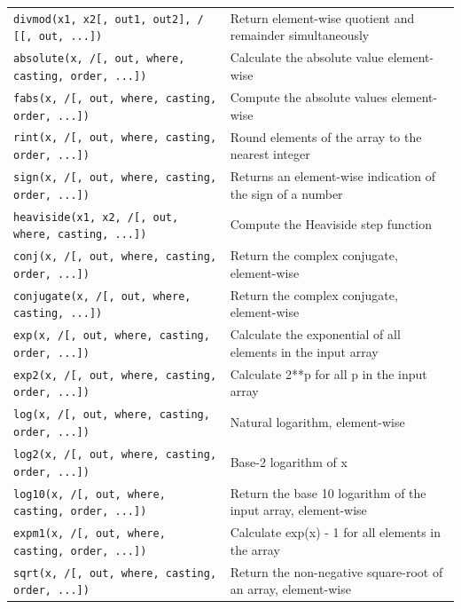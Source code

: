 \documentclass[a4paper,11pt]{book}
\begin{document}
\begin{appendices}
\begin{table}
\begin{tabular}{lp{13cm}}
\texttt{divmod(x1, x2[, out1, out2], / [[, out, ...])}& Return element-wise quotient and remainder simultaneously}\\
\texttt{absolute(x, /[, out, where, casting, order, ...])}& Calculate the absolute value element-wise}\\
\texttt{fabs(x, /[, out, where, casting, order, ...])}& Compute the absolute values element-wise}\\
\texttt{rint(x, /[, out, where, casting, order, ...])}& Round elements of the array to the nearest integer}\\
\texttt{sign(x, /[, out, where, casting, order, ...])}& Returns an element-wise indication of the sign of a number}\\
\texttt{heaviside(x1, x2, /[, out, where, casting, ...])}& Compute the Heaviside step function}\\
\texttt{conj(x, /[, out, where, casting, order, ...])}& Return the complex conjugate, element-wise}\\
\texttt{conjugate(x, /[, out, where, casting, ...])}& Return the complex conjugate, element-wise}\\
\texttt{exp(x, /[, out, where, casting, order, ...])}& Calculate the exponential of all elements in the input array}\\
\texttt{exp2(x, /[, out, where, casting, order, ...])}& Calculate 2**p for all p in the input array}\\
\texttt{log(x, /[, out, where, casting, order, ...])}& Natural logarithm, element-wise}\\
\texttt{log2(x, /[, out, where, casting, order, ...])}& Base-2 logarithm of x}\\
\texttt{log10(x, /[, out, where, casting, order, ...])}& Return the base 10 logarithm of the input array, element-wise}\\
\texttt{expm1(x, /[, out, where, casting, order, ...])}& Calculate exp(x) - 1 for all elements in the array}\\
\texttt{sqrt(x, /[, out, where, casting, order, ...])}& Return the non-negative square-root of an array, element-wise}\\
\bottomrule
\end{tabular}
\end{table}
\clearpage


\end{appendices}
\end{document}
